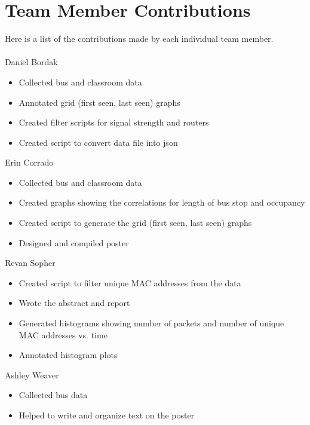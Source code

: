 \documentclass[letterpaper]{scrartcl}
\begin{document}
\section*{Team Member Contributions}
Here is a list of the contributions made by each individual team member.
\\
\\
Daniel Bordak
\begin{itemize}
  \item Collected bus and classroom data
  \item Annotated grid (first seen, last seen) graphs
  \item Created filter scripts for signal strength and routers
  \item Created script to convert data file into json
\end{itemize}
\vspace{10 mm}
Erin Corrado
\begin{itemize}
  \item Collected bus and classroom data
  \item Created graphs showing the correlations for length of bus stop and occupancy
  \item Created script to generate the grid (first seen, last seen) graphs
  \item Designed and compiled poster
\end{itemize}
\vspace{10 mm}
Revan Sopher
\begin{itemize}
  \item Created script to filter unique MAC addresses from the data
  \item Wrote the abstract and report
  \item Generated histograms showing number of packets and number of unique MAC addresses vs. time
  \item Annotated histogram plots
\end{itemize}
\vspace{10 mm}
Ashley Weaver
\begin{itemize}
  \item Collected bus data
  \item Helped to write and organize text on the poster
\end{itemize}
\end{document}
